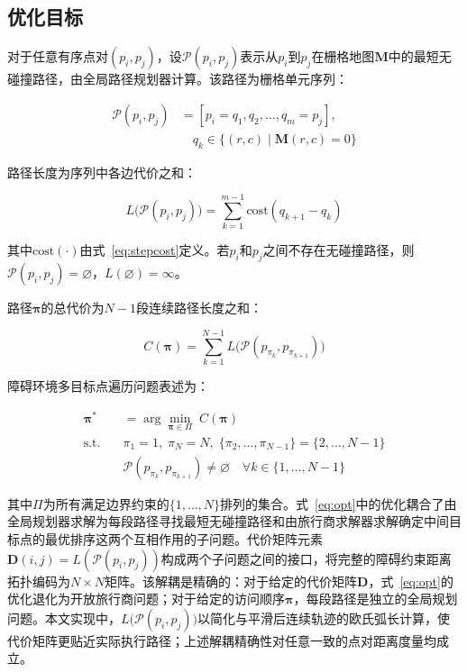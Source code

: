 \documentclass[lettersize,journal]{IEEEtran}
\begin{document}
\subsection{优化目标}

对于任意有序点对$(p_i, p_j)$，设$\mathcal{P}(p_i, p_j)$表示从$p_i$到$p_j$在栅格地图$\mathbf{M}$中的最短无碰撞路径，由全局路径规划器计算。该路径为栅格单元序列：

\begin{equation}
\begin{split}
\mathcal{P}(p_i, p_j) &= [p_i = q_1, q_2, \dots, q_m = p_j],\\
&\quad q_k \in \{(r, c) \mid \mathbf{M}(r, c) = 0\}
\end{split}
\label{eq:pathseq}
\end{equation}

路径长度为序列中各边代价之和：

\begin{equation}
L\big(\mathcal{P}(p_i, p_j)\big) = \sum_{k=1}^{m-1} \mathrm{cost}(q_{k+1} - q_k)
\label{eq:pathlen}
\end{equation}

其中$\mathrm{cost}(\cdot)$由式~\textcolor{blue}{\eqref{eq:stepcost}}定义。若$p_i$和$p_j$之间不存在无碰撞路径，则$\mathcal{P}(p_i, p_j) = \varnothing$，$L(\varnothing) = \infty$。

路径$\bm{\pi}$的总代价为$N-1$段连续路径长度之和：

\begin{equation}
C(\bm{\pi}) = \sum_{k=1}^{N-1} L\big(\mathcal{P}(p_{\pi_k}, p_{\pi_{k+1}})\big)
\label{eq:totalcost}
\end{equation}

障碍环境多目标点遍历问题表述为：

\begin{align}
\bm{\pi}^{*} &= \arg\min_{\bm{\pi} \in \Pi} \; C(\bm{\pi})
\label{eq:opt}\\
\text{s.t.} \quad &\pi_1 = 1,\; \pi_N = N,\; \{\pi_2, \dots, \pi_{N-1}\} = \{2, \dots, N-1\} \nonumber\\
&\mathcal{P}(p_{\pi_k}, p_{\pi_{k+1}}) \neq \varnothing \quad \forall k \in \{1, \dots, N-1\} \nonumber
\end{align}

其中$\Pi$为所有满足边界约束的$\{1, \dots, N\}$排列的集合。式~\textcolor{blue}{\eqref{eq:opt}}中的优化耦合了由全局规划器求解为每段路径寻找最短无碰撞路径和由旅行商求解器求解确定中间目标点的最优排序这两个互相作用的子问题。代价矩阵元素$\mathbf{D}(i, j) = L(\mathcal{P}(p_i, p_j))$构成两个子问题之间的接口，将完整的障碍约束距离拓扑编码为$N \times N$矩阵。该解耦是精确的：对于给定的代价矩阵$\mathbf{D}$，式~\textcolor{blue}{\eqref{eq:opt}}的优化退化为开放旅行商问题；对于给定的访问顺序$\bm{\pi}$，每段路径是独立的全局规划问题。本文实现中，$L\big(\mathcal{P}(p_i, p_j)\big)$以简化与平滑后连续轨迹的欧氏弧长计算，使代价矩阵更贴近实际执行路径；上述解耦精确性对任意一致的点对距离度量均成立。
\end{document}
